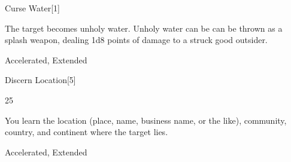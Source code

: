 \begin{spellsection}{Curse Water}[1]
\begin{spellcontent}
\begin{spelltargetinginfo}
\end{spelltargetinginfo}
\begin{spelleffects}
\spelleffect
The target becomes unholy water.
Unholy water can be can be thrown as a splash weapon, dealing 1d8 points of damage to a struck good outsider.
\end{spelleffects}
\end{spellcontent}
\begin{spellfooter}
 Accelerated, Extended
\end{spellfooter}
\begin{spellsubcontent}
\end{spellsubcontent}
\end{spellsection}
\begin{spellsection}{Discern Location}[5]
\begin{spellcontent}
\begin{spelltargetinginfo}
 25
\end{spelltargetinginfo}
\begin{spelleffects}
\spelleffect
You learn the location (place, name, business name, or the like), community, country, and continent where the target lies.
\end{spelleffects}
\end{spellcontent}
\begin{spellfooter}
 Accelerated, Extended
\end{spellfooter}
\begin{spellsubcontent}
\end{spellsubcontent}
\end{spellsection}
